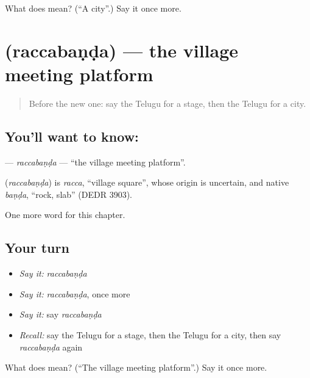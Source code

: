 \begin{tcolorbox}[breakable,colback=teal!4,colframe=teal!35!black,title={Before you move on}]
What does  mean? (\textquotedblleft{}A city\textquotedblright{}.) Say it once more.
\end{tcolorbox}
\section[\texorpdfstring{\te{రచ్చబండ} (raccabaṇḍa)}{రచ్చబండ (raccabaṇḍa)}]{ (raccabaṇḍa) — the village meeting platform}

\label{lesson:TE-C255-raccabanda}



\begin{quote}
Before the new one: say the Telugu for a stage, then the Telugu for a city.
\end{quote}

\subsection*{You'll want to know: }
\textbf{} — \emph{raccabaṇḍa} — \textquotedblleft{}the village meeting platform\textquotedblright{}.

\begin{cousinweb}
\textbf{} (\emph{raccabaṇḍa}) is \emph{racca}, \textquotedblleft{}village square\textquotedblright{}, whose origin is uncertain, and native \emph{baṇḍa}, \textquotedblleft{}rock, slab\textquotedblright{} (DEDR 3903).
\end{cousinweb}

\begin{grammarlens}[title={What you've built}]
One more word for this chapter.
\end{grammarlens}

\subsection*{Your turn}
\begin{itemize}
\raggedright
  \item \emph{Say it:} \emph{raccabaṇḍa}
  \item \emph{Say it:} \emph{raccabaṇḍa}, once more
  \item \emph{Say it:} say \emph{raccabaṇḍa}
  \item \emph{Recall:} say the Telugu for a stage, then the Telugu for a city, then say \emph{raccabaṇḍa} again
\end{itemize}

\begin{tcolorbox}[breakable,colback=teal!4,colframe=teal!35!black,title={Before you move on}]
What does  mean? (\textquotedblleft{}The village meeting platform\textquotedblright{}.) Say it once more.
\end{tcolorbox}
